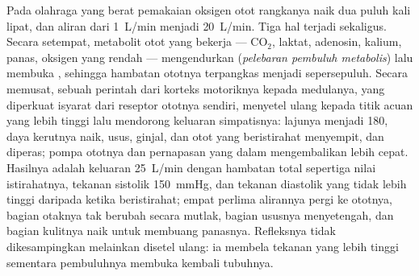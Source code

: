 \begin{proposition}[Olahraga]\label{prop:b2:blood-pressure:exercise}
Pada olahraga yang berat pemakaian oksigen otot rangkanya naik dua
puluh kali lipat, dan aliran  dari \qty{1}{L/min} menjadi
\qty{20}{L/min}. Tiga hal terjadi sekaligus. Secara setempat,
metabolit otot yang bekerja --- $\mathrm{CO_2}$, laktat, adenosin,
kalium, panas, oksigen yang rendah --- mengendurkan 
(\emph{pelebaran pembuluh metabolis}) lalu membuka ,
sehingga hambatan ototnya terpangkas menjadi sepersepuluh. Secara
memusat, sebuah perintah dari korteks motoriknya kepada medulanya,
yang diperkuat isyarat dari reseptor ototnya sendiri, menyetel ulang
 kepada titik acuan yang lebih tinggi lalu mendorong
keluaran simpatisnya: lajunya menjadi 180, daya kerutnya naik, 
usus, ginjal, dan otot yang beristirahat menyempit, dan 
diperas; pompa ototnya dan pernapasan yang dalam mengembalikan 
lebih cepat. Hasilnya adalah keluaran \qty{25}{L/min} dengan hambatan
total sepertiga nilai istirahatnya, tekanan sistolik \qty{150}{mmHg},
dan tekanan diastolik yang tidak lebih tinggi daripada ketika
beristirahat; empat perlima alirannya pergi ke ototnya, bagian otaknya
tak berubah secara mutlak, bagian ususnya menyetengah, dan bagian
kulitnya naik untuk membuang panasnya. Refleksnya tidak dikesampingkan
melainkan disetel ulang: ia membela tekanan yang lebih tinggi sementara
pembuluhnya membuka kembali tubuhnya.
\end{proposition}

